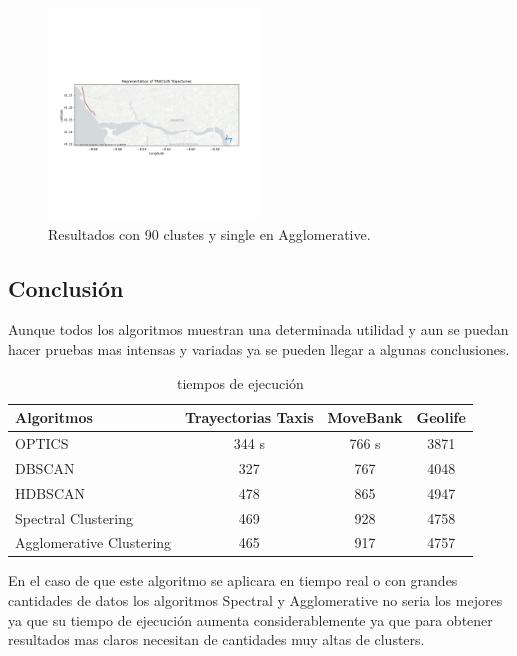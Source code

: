 \begin{figure}[h!]
    \centering
    \includegraphics[width=0.5\textwidth]{img/Taxis/map_agglo_par.png}
    \caption{Resultados con 90 clustes y single en Agglomerative.}
    \label{fig:agglo_par}
\end{figure}

\subsection{Conclusión}

Aunque todos los algoritmos muestran una determinada utilidad y aun se puedan hacer pruebas mas intensas y variadas ya se pueden llegar a algunas conclusiones.

\begin{table}[ht]
\centering
\begin{tabular}{|l|c|c|c|}
\hline
\textbf{Algoritmos} & \textbf{Trayectorias Taxis} & \textbf{MoveBank} & \textbf{Geolife}  \\
\hline
OPTICS & 344 s & 766 s & 3871 \\
DBSCAN & 327 & 767 & 4048 \\
HDBSCAN & 478 & 865 & 4947 \\
Spectral Clustering & 469 & 928 & 4758 \\
Agglomerative Clustering & 465 & 917 & 4757 \\
\hline
\end{tabular}
\caption{tiempos de ejecución}
\label{tabla:comparacion_algoritmos}
\end{table}

En el caso de que este algoritmo se aplicara en tiempo real o con grandes cantidades de datos los algoritmos Spectral y Agglomerative no seria los mejores ya que su tiempo de ejecución aumenta considerablemente ya que para obtener resultados mas claros necesitan de cantidades muy altas de clusters.

